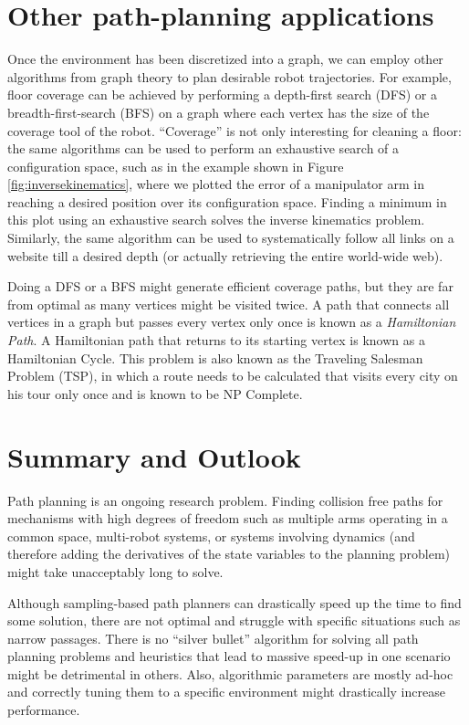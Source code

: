 \section{Other path-planning applications}
Once the environment has been discretized into a graph, we can employ other algorithms from graph theory to plan desirable robot trajectories. For example, floor coverage can be achieved by performing a depth-first search (DFS) or a breadth-first-search (BFS) on a graph where each vertex has the size of the coverage tool of the robot. ``Coverage'' is not only interesting for cleaning a floor: the same algorithms can be used to perform an exhaustive search of a configuration space, such as in the example shown in Figure \ref{fig:inversekinematics}, where we plotted the error of a manipulator arm in reaching a desired position over its configuration space. Finding a minimum in this plot using an exhaustive search solves the inverse kinematics problem. Similarly, the same algorithm can be used to systematically follow all links on a website till a desired depth (or actually retrieving the entire world-wide web).

Doing a DFS or a BFS might generate efficient coverage paths, but they are far from optimal as many vertices might be visited twice. A path that connects all vertices in a graph but passes every vertex only once is known as a \emph{Hamiltonian Path}. A Hamiltonian path that returns to its starting vertex is known as a Hamiltonian Cycle. This problem is also known as the Traveling Salesman Problem (TSP), in which a route needs to be calculated that visits every city on his tour only once and is known to be NP Complete.



\section{Summary and Outlook}
Path planning is an ongoing research problem. Finding collision free paths for mechanisms with high degrees of freedom such as multiple arms operating in a common space, multi-robot systems, or systems involving dynamics (and therefore adding the derivatives of the state variables to the planning problem) might take unacceptably long to solve.

Although sampling-based path planners can drastically speed up the time to find some solution, there are not optimal and struggle with specific situations such as narrow passages. There is no ``silver bullet'' algorithm for solving all path planning problems and heuristics that lead to massive speed-up in one scenario might be detrimental in others. Also, algorithmic parameters are mostly ad-hoc and correctly tuning them to a specific environment might drastically increase performance.



